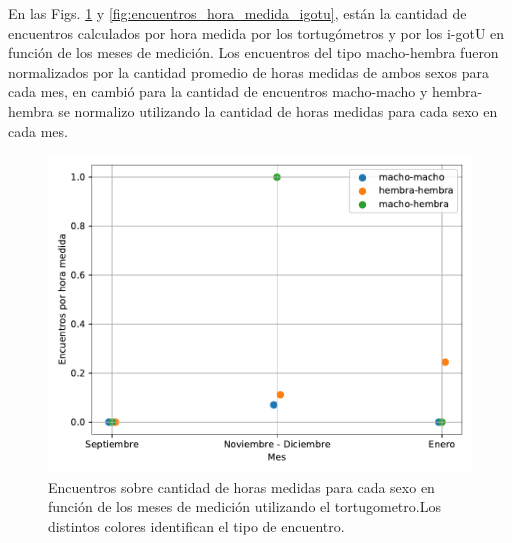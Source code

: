 En las Figs. \ref{fig:encuentros_hora_medida_tortugometro} y \ref{fig:encuentros_hora_medida_igotu}, están la cantidad de encuentros calculados por hora medida por los tortugómetros y por los i-gotU en función de los meses de medición. Los encuentros del tipo macho-hembra fueron normalizados por la cantidad promedio de horas medidas de ambos sexos para cada mes, en cambió para la cantidad de encuentros macho-macho y hembra-hembra se normalizo utilizando la cantidad de horas medidas para cada sexo en cada mes.  
\begin{figure}[ht]
    \begin{center}
       
   
    \includegraphics[width=\imsize]{Chap2/encuentros_por_hora_tortugometro.pdf}
\end{center}
    \caption[Encuentros por hora medida tomando los datos del tortugometro.]{Encuentros sobre cantidad de horas medidas para cada sexo en función de los meses de medición utilizando el tortugometro.Los distintos colores identifican el tipo de encuentro.}
    \label{fig:encuentros_hora_medida_tortugometro}
\end{figure}

